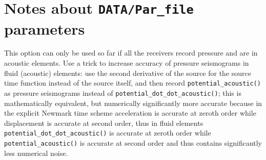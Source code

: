 \section*{Notes about \texttt{DATA/Par\_file} parameters}


\begin{description}[font=\ttfamily]

\item[USE\_TRICK\_FOR\_BETTER\_PRESSURE]

This option can only be used so far if all the receivers record pressure and are in acoustic elements.
Use a trick to increase accuracy of pressure seismograms in fluid (acoustic) elements:
use the second derivative of the source for the source time function instead of the source itself,
and then record \texttt{potential\_acoustic()} as pressure seismograms instead of \texttt{potential\_dot\_dot\_acoustic()};
this is mathematically equivalent, but numerically significantly more accurate because in the explicit
Newmark time scheme acceleration is accurate at zeroth order while displacement is accurate at second order,
thus in fluid elements \texttt{potential\_dot\_dot\_acoustic()} is accurate at zeroth order while \texttt{potential\_acoustic()}
is accurate at second order and thus contains significantly less numerical noise.




\end{description}
